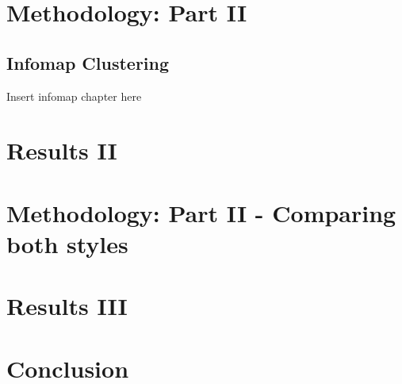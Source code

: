 \documentclass{pasa}%
\begin{document}
\section{Methodology: Part II}

\subsection{Infomap Clustering}


Insert infomap chapter here
\section{Results II}


\section{Methodology: Part II - Comparing both styles}

\section{Results III}


\section{Conclusion}

\tableofcontents



\end{document}
